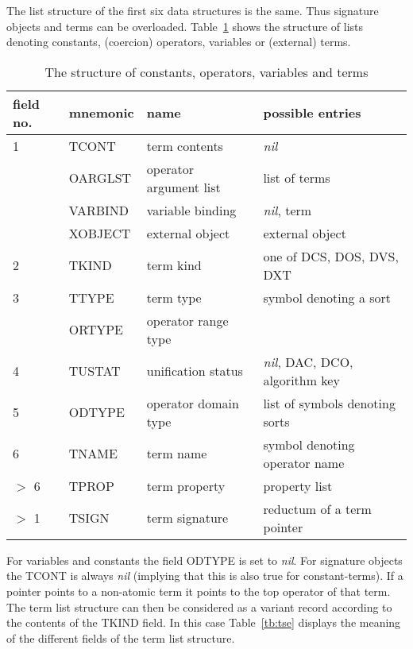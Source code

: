 The list structure of the first six data structures is the same.
Thus signature objects and terms can be overloaded.
Table~\ref{tb:tsy} shows the structure of lists denoting 
constants, (coercion) operators, variables or (external) terms.
\begin{table} 
\begin{center}
\begin{tabular}{|l|l|l|l|}
 \hline
 field no. & mnemonic & name & possible entries \\
 \hline\hline
 1 & TCONT & term contents & {\it nil}          \\
   & OARGLST & operator argument list & list of terms \\
   & VARBIND & variable binding & {\it nil}, term \\
   & XOBJECT & external object  & external object     \\
 \hline
 2 & TKIND & term kind     & one of DCS, DOS, DVS, DXT \\
 \hline
 3 & TTYPE &  term type & symbol denoting a sort\\
   & ORTYPE& operator range type & \\
 \hline
 4 & TUSTAT & unification status & {\it nil}, DAC, DCO,  algorithm key \\
 \hline
 5 & ODTYPE & operator domain type & list of symbols denoting sorts\\
 \hline
 6 & TNAME & term name & symbol denoting operator name \\
 \hline
 $>$ 6 & TPROP & term property & property list \\
 \hline
 $>$ 1 & TSIGN & term signature & reductum of a term pointer \\
 \hline
\end{tabular}
\caption{The structure  of constants, operators, variables and terms} 
\label{tb:tsy}
\end{center}
\end{table}
For variables and constants the field ODTYPE is set to {\it nil}. 
For signature objects the TCONT is always {\it nil} (implying that this is
also true for constant-terms).
If a pointer points to a non-atomic term it points to the top operator
of that term. The term list structure can then be considered as a variant
record according to the contents of the TKIND field.
In this case Table~\ref{tb:tse} displays the meaning of the different
fields of the term list structure.
